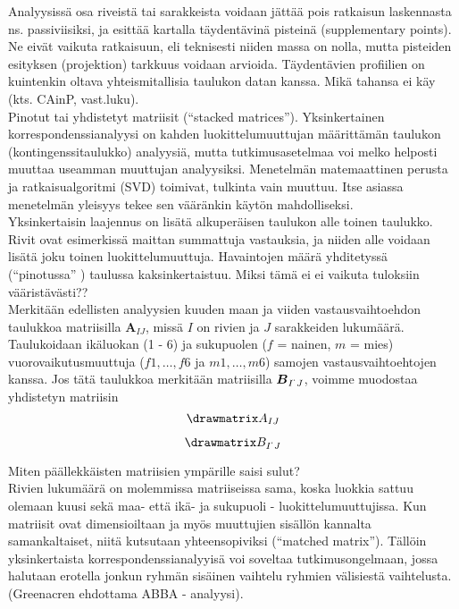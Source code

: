 \documentclass[12pt,a4paper,leqno]{article}
\theoremstyle{plain}
\theoremstyle{definition}
\theoremstyle{remark}
\begin{document}
Analyysissä osa riveistä tai sarakkeista voidaan jättää pois ratkaisun laskennasta ns. passiviisiksi, ja esittää kartalla täydentävinä pisteinä (supplementary points). Ne eivät vaikuta ratkaisuun, eli teknisesti niiden massa on nolla, mutta pisteiden esityksen (projektion) tarkkuus voidaan arvioida. Täydentävien profiilien on kuintenkin oltava yhteismitallisia taulukon datan kanssa. Mikä tahansa ei käy (kts. CAinP, vast.luku).\\

Pinotut tai yhdistetyt matriisit (``stacked matrices''). Yksinkertainen korrespondenssianalyysi on kahden luokittelumuuttujan määrittämän taulukon (kontingenssitaulukko) analyysiä, mutta tutkimusasetelmaa voi melko helposti muuttaa useamman muuttujan analyysiksi. Menetelmän matemaattinen perusta ja ratkaisualgoritmi (SVD) toimivat, tulkinta vain muuttuu. Itse asiassa menetelmän yleisyys tekee sen vääränkin käytön mahdolliseksi.\\

Yksinkertaisin laajennus on lisätä alkuperäisen taulukon alle toinen taulukko. Rivit ovat esimerkissä maittan summattuja vastauksia, ja niiden alle voidaan lisätä joku toinen luokittelumuuttuja. Havaintojen määrä yhditetyssä (``pinotussa'' ) taulussa kaksinkertaistuu. Miksi tämä ei ei vaikuta tuloksiin vääristävästi??\\

Merkitään edellisten analyysien kuuden maan ja viiden vastausvaihtoehdon taulukkoa matriisilla $\boldsymbol{ A}_{I  J}$, missä $I$ on rivien ja $J$ sarakkeiden lukumäärä. Taulukoidaan ikäluokan (1 - 6) ja sukupuolen ($f$ = nainen, $m$ = mies) vuorovaikutusmuuttuja ($f1,\dots , f6$ ja $m1,\dots , m6$) samojen vastausvaihtoehtojen kanssa. Jos tätä taulukkoa merkitään matriisilla 
$\boldsymbol{ B}_{I^{`}  J}$, voimme muodostaa yhdistetyn matriisin\\

\[
\drawmatrix A_{I J}
\]

\[
\drawmatrix B_{I^{`}  J}
\]

Miten päällekkäisten matriisien ympärille saisi sulut?\\

Rivien lukumäärä on molemmissa matriiseissa sama, koska luokkia sattuu olemaan kuusi sekä maa- että ikä- ja sukupuoli - luokittelumuuttujissa. Kun matriisit ovat dimensioiltaan ja myös muuttujien sisällön kannalta samankaltaiset, niitä kutsutaan yhteensopiviksi (``matched matrix''). Tällöin yksinkertaista korrespondenssianalyyisä voi soveltaa tutkimusongelmaan, jossa halutaan erotella jonkun ryhmän sisäinen vaihtelu ryhmien välisiestä vaihtelusta. (Greenacren ehdottama ABBA - analyysi).\\
\end{document}
